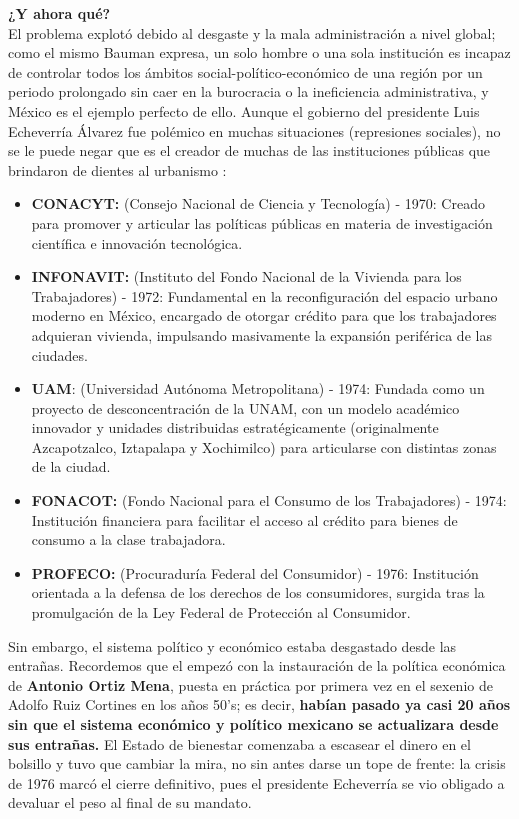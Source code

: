 \textbf{¿Y ahora qué?}\\
El problema explotó debido al desgaste y la mala administración a nivel global; como el mismo Bauman expresa, un solo hombre o una sola institución es incapaz de controlar
todos los ámbitos social-político-económico de una región por un periodo prolongado sin caer en la burocracia o la ineficiencia administrativa, y México 
es el ejemplo perfecto de ello. Aunque el gobierno del presidente Luis Echeverría Álvarez fue polémico en muchas situaciones (represiones sociales), 
no se le puede negar que es el creador de muchas de las instituciones públicas que brindaron de dientes al urbanismo \cite{medin1982sexenio}: 
\begin{itemize} 
      \item \textbf{CONACYT:} (Consejo Nacional de Ciencia y Tecnología) - 1970: Creado para promover y articular las políticas públicas en materia de investigación 
      científica e innovación tecnológica.
      \item \textbf{INFONAVIT:} (Instituto del Fondo Nacional de la Vivienda para los Trabajadores) - 1972: Fundamental en la reconfiguración del espacio urbano moderno 
            en México, encargado de otorgar crédito para que los trabajadores adquieran vivienda, impulsando masivamente la expansión periférica de las ciudades.
      \item \textbf{UAM}: (Universidad Autónoma Metropolitana) - 1974: Fundada como un proyecto de desconcentración de la UNAM, con un modelo académico innovador y 
            unidades distribuidas estratégicamente (originalmente Azcapotzalco, Iztapalapa y Xochimilco) para articularse con distintas zonas de la ciudad.
      \item \textbf{FONACOT:} (Fondo Nacional para el Consumo de los Trabajadores) - 1974: Institución financiera para facilitar el acceso al crédito para bienes de 
            consumo a la clase trabajadora.
      \item \textbf{PROFECO:} (Procuraduría Federal del Consumidor) - 1976: Institución orientada a la defensa de los derechos de los consumidores, surgida tras la 
            promulgación de la Ley Federal de Protección al Consumidor.
\end{itemize}
Sin embargo, el sistema político y económico estaba desgastado desde las entrañas. Recordemos que el  empezó con la instauración de la
política económica de \textbf{Antonio Ortiz Mena}, puesta en práctica por primera vez en el sexenio de Adolfo Ruiz Cortines en los años 50's; es decir,
\textbf{habían pasado ya casi 20 años sin que el sistema económico y político mexicano se actualizara desde sus entrañas.} El Estado de bienestar comenzaba
a escasear el dinero en el bolsillo y tuvo que cambiar la mira, no sin antes darse un tope de frente: la crisis de 1976 marcó el cierre definitivo, pues el presidente
Echeverría se vio obligado a devaluar el peso al final de su mandato.


